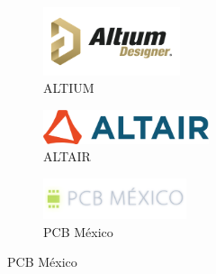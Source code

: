 \documentclass[letterpaper,12pt]{article} %
\begin{document}
    \begin{figure}[h!]
    \centering
    \begin{subfigure}[b]{0.3\textwidth}
        \centering
        \includegraphics[height=2cm]{ALTIUM.png}
        \caption{ALTIUM}
        \label{fig:ALTIUM}
    \end{subfigure}
    \hfill
    \begin{subfigure}[b]{0.3\textwidth}
        \centering
        \includegraphics[height=1cm]{ALTAIR.png}
        \vspace{0.1cm}
        \caption{ALTAIR}
        \label{fig:ALTAIR}
    \end{subfigure}
    \hfill
    \begin{subfigure}[b]{0.3\textwidth}
        \centering
        \includegraphics[height=1.2cm]{PCBMEX.png}
        \vspace{0.5cm}
        \caption{PCB México}
        \label{fig:PCBMEX}
    \end{subfigure}
    \end{figure}
\end{document}
